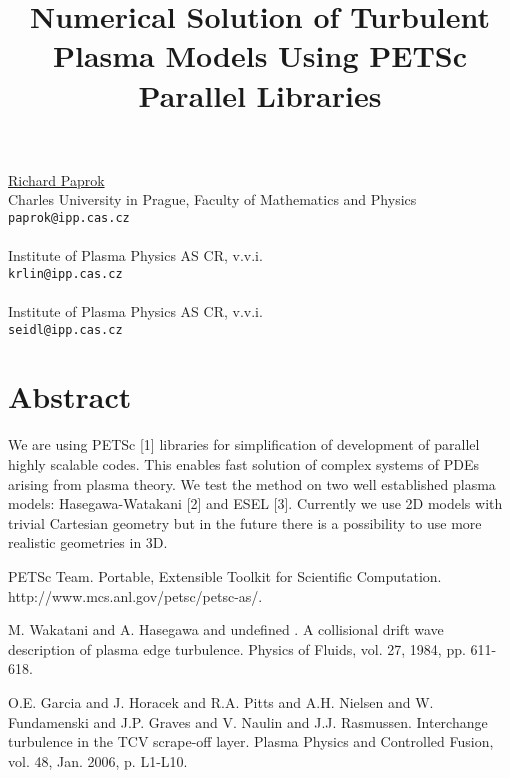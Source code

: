 \title{Numerical Solution of Turbulent Plasma Models Using PETSc Parallel Libraries}
\author{}  \institute{}
\maketitle
\begin{center}
{\large \underline{Richard Paprok}}\\
Charles University in Prague, Faculty of Mathematics and Physics\\
{\tt paprok@ipp.cas.cz}
\\ \vspace{4mm}{\large Ladislav Krlin}\\
Institute of Plasma Physics AS CR, v.v.i.\\
{\tt krlin@ipp.cas.cz}
\\ \vspace{4mm}{\large Jakub Seidl}\\
Institute of Plasma Physics AS CR, v.v.i.\\
{\tt seidl@ipp.cas.cz}

\end{center}

\section*{Abstract}

We are using PETSc [1] libraries for simplification of development of parallel highly scalable codes. This enables fast solution of complex systems of PDEs arising from plasma theory. We test the method on two well established plasma models: Hasegawa-Watakani [2] and ESEL [3]. Currently we use 2D models with trivial Cartesian geometry but in the future there is a possibility to use more realistic geometries in 3D.


\begin{thebibliography}{10}

{\sc PETSc Team}. {Portable, Extensible Toolkit for Scientific Computation}.  http://www.mcs.anl.gov/petsc/petsc-as/.

{\sc M. Wakatani and A. Hasegawa and undefined }. {A collisional drift wave description of plasma edge turbulence}. Physics of Fluids, vol. 27, 1984, pp. 611-618.



{\sc O.E. Garcia and J. Horacek and R.A. Pitts and A.H. Nielsen and W. Fundamenski and J.P. Graves and V. Naulin and J.J. Rasmussen}. {Interchange turbulence in the TCV scrape-off layer}. Plasma Physics and Controlled Fusion, vol. 48, Jan. 2006, p. L1-L10.
\end{thebibliography}
